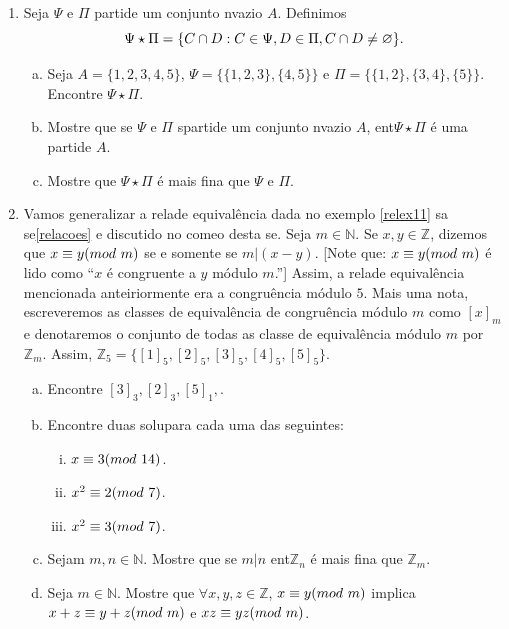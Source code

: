 \begin{enumerate}[{\bf 1.}]
\item\label{eqexcer7} Seja $\Psi$ e $\Pi$ parti\coes de um conjunto n\ao vazio $A$. Definimos
\[
\Psi\star\Pi=\{C\cap D: C\in\Psi, D\in\Pi,C\cap D\neq\varnothing\}.
\]
\begin{enumerate}[a)]
\item Seja $A=\{1,2,3,4,5\}$, $\Psi=\{\{1,2,3\},\{4,5\}\}$ e $\Pi=\{\{1,2\},\{3,4\},\{5\}\}$. Encontre $\Psi\star\Pi$.
\item Mostre que se $\Psi$ e $\Pi$ s\ao parti\coes de um conjunto n\ao vazio $A$, ent\ao $\Psi\star\Pi$ \'e uma parti\cao de $A$.
\item Mostre que $\Psi\star\Pi$ \'e mais fina que $\Psi$ e $\Pi$.
\end{enumerate}

\item\label{equivalenciaex8} Vamos generalizar a rela\cao de equival\^encia dada no exemplo \ref{relex11} sa se\cao \ref{relacoes} e discutido no come\cc o desta se\caoi. Seja $m\in\mathbb{N}$. Se $x,y\in\mathbb{Z}$, dizemos que $x\equiv y(mod \textrm{ } m)$ se e somente se $m|(x-y)$. [Note que: $x\equiv y(mod \textrm{ } m)$ \'e lido como ``$x$ \'e congruente a $y$ m\'odulo $m$.''] Assim, a rela\cao de equival\^encia mencionada anteiriormente era a congru\^encia m\'odulo $5$. Mais uma nota\caoi, escreveremos as classes de equival\^encia de congru\^encia m\'odulo $m$ como $[x]_m$ e denotaremos o conjunto de todas as classe de equival\^encia m\'odulo $m$ por $\mathbb{Z}_m$. Assim, $\mathbb{Z}_5=\{[1]_5,[2]_5,[3]_5,[4]_5,[5]_5\}$.
\begin{enumerate}[a)]
\item Encontre $[3]_3,[2]_3,[5]_1,$.
\item Encontre duas solu\coes para cada uma das seguintes:
\begin{enumerate}[i)]
\item $x\equiv 3(mod \textrm{ } 14)$.
\item $x^2\equiv 2(mod \textrm{ } 7)$.
\item $x^2\equiv 3(mod \textrm{ } 7)$.
\end{enumerate}
\item Sejam $m,n\in\mathbb{N}$. Mostre que se $m|n$ ent\ao $\mathbb{Z}_n$ \'e mais fina que $\mathbb{Z}_m$.
\item Seja $m\in\mathbb{N}$. Mostre que $\forall x,y,z\in\mathbb{Z}$, $x\equiv y(mod \textrm{ } m)$ implica $x+z\equiv y+z(mod \textrm{ } m)$ e $xz\equiv yz(mod \textrm{ } m)$.
\end{enumerate}


\end{enumerate}
